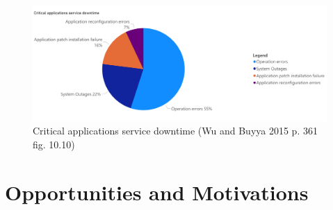 \begin{figure}[h]
    \centering
    \includegraphics[width=\textwidth]{images/critical-applications-service-downtime.pdf}
    \captionsetup{justification=centering}
    \caption[Critical applications service downtime]{Critical applications service downtime
    (Wu and Buyya 2015 p. 361 fig. 10.10)}
    \label{fig:critical-applications}
\end{figure}

\clearpage

\section{Opportunities and Motivations}

